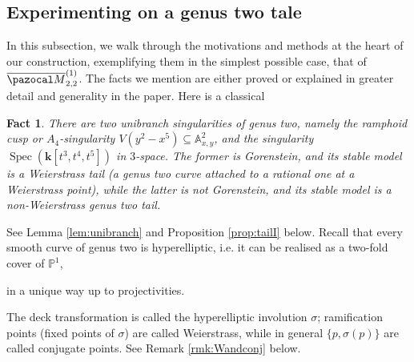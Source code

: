 \documentclass[11pt]{amsart}
\newcommand{\PP}{\mathbb P}
\renewcommand{\k}{\mathbf k}
\newcommand{\Aaff}{\mathbb A}
\newcommand{\oM}{\overline{\pazocal M}}
\theoremstyle{plain}
\newtheorem*{fact}{Fact}
\theoremstyle{definition}
\begin{document}
\subsection{Experimenting on a genus two tale}  In this subsection, we walk through the motivations and methods at the heart of our construction, exemplifying them in the simplest possible case, that of $\oM_{2,2}^{(1)}$. The facts we mention are either proved or explained in greater detail and generality in the paper. Here is a classical
\begin{fact}
 There are two unibranch singularities of genus two, namely the \emph{ramphoid cusp} or \emph{$A_4$-singularity} $V(y^2-x^5)\subseteq \Aaff^2_{x,y}$, and the singularity $\operatorname{Spec}(\k[t^3,t^4,t^5])$ in $3$-space. The former is Gorenstein, and its stable model is a Weierstrass tail (a genus two curve attached to a rational one at a Weierstrass point), while the latter is not Gorenstein, and its stable model is a non-Weierstrass genus two tail.
\end{fact}
See Lemma \ref{lem:unibranch} and Proposition \ref{prop:tailI} below. Recall that every smooth curve of genus two is hyperelliptic, i.e. it can be realised as a two-fold cover of $\PP^1$, 

in a unique way up to projectivities. 

The deck transformation is called the hyperelliptic involution $\sigma$; ramification points (fixed points of $\sigma$) are called Weierstrass, while in general $\{p,\sigma(p)\}$ are called conjugate points. See Remark \ref{rmk:Wandconj} below.
\end{document}
